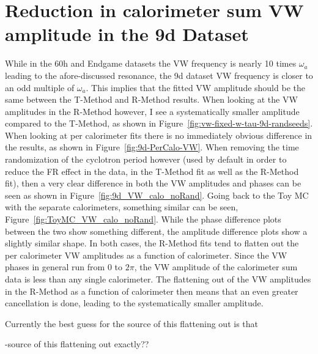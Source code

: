 \documentclass[12pt,letterpaper]{article}
\newcommand{\figref}[1]{Figure~\ref{#1}}
\def\wa{$\omega_{a}$\xspace}
\begin{document}
\clearpage


\section{Reduction in calorimeter sum VW amplitude in the 9d Dataset}


While in the 60h and Endgame datasets the VW frequency is nearly 10 times \wa leading to the afore-discussed resonance, the 9d dataset VW frequency is closer to an odd multiple of \wa. This implies that the fitted VW amplitude should be the same between the T-Method and R-Method results. When looking at the VW amplitudes in the R-Method however, I see a systematically smaller amplitude compared to the T-Method, as shown in \figref{fig:vw-fixed-w-tau-9d-randseeds}. When looking at per calorimeter fits there is no immediately obvious difference in the results, as shown in \figref{fig:9d-PerCalo-VW}. When removing the time randomization of the cyclotron period however (used by default in order to reduce the FR effect in the data, in the T-Method fit as well as the R-Method fit), then a very clear difference in both the VW amplitudes and phases can be seen as shown in \figref{fig:9d_VW_calo_noRand}. Going back to the Toy MC with the separate calorimeters, something similar can be seen, \figref{fig:ToyMC_VW_calo_noRand}. While the phase difference plots between the two show something different, the amplitude difference plots show a slightly similar shape. In both cases, the R-Method fits tend to flatten out the per calorimeter VW amplitudes as a function of calorimeter. Since the VW phases in general run from 0 to $2\pi$, the VW amplitude of the calorimeter sum data is less than any single calorimeter. The flattening out of the VW amplitudes in the R-Method as a function of calorimeter then means that an even greater cancellation is done, leading to the systematically smaller amplitude.


Currently the best guess for the source of this flattening out is that 


-source of this flattening out exactly??
\end{document}
